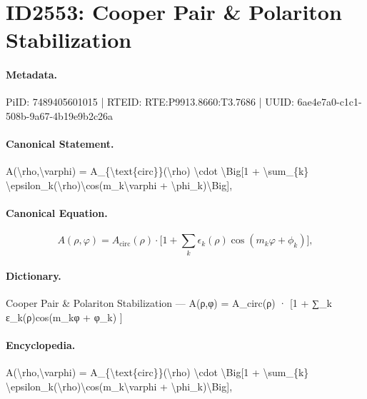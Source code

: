 \section*{ID2553: Cooper Pair \& Polariton Stabilization}
\paragraph{Metadata.}
PiID: 7489405601015 | RTEID: RTE:P9913.8660:T3.7686 | UUID: 6ae4e7a0-c1c1-508b-9a67-4b19e9b2c26a

\paragraph{Canonical Statement.}
A(\textbackslash{}rho,\textbackslash{}varphi) = A\_\{\textbackslash{}text\{circ\}\}(\textbackslash{}rho) \textbackslash{}cdot \textbackslash{}Big[1 + \textbackslash{}sum\_\{k\} \textbackslash{}epsilon\_k(\textbackslash{}rho)\textbackslash{}cos(m\_k\textbackslash{}varphi + \textbackslash{}phi\_k)\textbackslash{}Big],

\paragraph{Canonical Equation.}
\[
A(\rho,\varphi) = A_{\text{circ}}(\rho) \cdot \Big[1 + \sum_{k} \epsilon_k(\rho)\cos(m_k\varphi + \phi_k)\Big],
\]

\paragraph{Dictionary.}
Cooper Pair \& Polariton Stabilization — A(ρ,φ) = A\_circ(ρ) · [1 + ∑\_k ε\_k(ρ)cos(m\_kφ + φ\_k) ]

\paragraph{Encyclopedia.}
A(\textbackslash{}rho,\textbackslash{}varphi) = A\_\{\textbackslash{}text\{circ\}\}(\textbackslash{}rho) \textbackslash{}cdot \textbackslash{}Big[1 + \textbackslash{}sum\_\{k\} \textbackslash{}epsilon\_k(\textbackslash{}rho)\textbackslash{}cos(m\_k\textbackslash{}varphi + \textbackslash{}phi\_k)\textbackslash{}Big],
